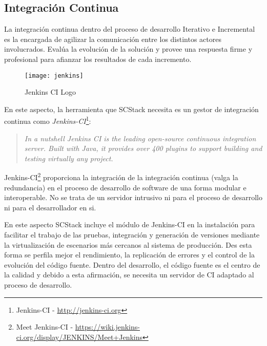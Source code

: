 

\subsection{Integración Continua}
\label{sub:ci-jenkins}

\par  La integración continua dentro del proceso de desarrollo Iterativo e Incremental es la encargada de agilizar la comunicación entre los distintos actores involucrados. Evalúa la evolución de la solución y provee una respuesta firme y profesional para afianzar los resultados de cada incremento.

\begin{figure}[H]
    \centering
    \texttt{[image: jenkins]}
    \caption{Jenkins CI Logo}
    \label{fig:jenkins-logo}
\end{figure}


\par En este aspecto, la herramienta que SCStack necesita es un gestor de integración continua como \emph{Jenkins-CI}\footnote{Jenkins-CI - \url{http://jenkins-ci.org}}:

\begin{quote}
    \emph{In a nutshell Jenkins CI is the leading open-source continuous integration server. Built with Java, it provides over 400 plugins to support building and testing virtually any project.}
\end{quote}

\par Jenkins-CI\footnote{Meet Jenkins-CI - \url{https://wiki.jenkins-ci.org/display/JENKINS/Meet+Jenkins}} proporciona la integración de la integración continua (valga la redundancia) en el proceso de desarrollo de software de una forma modular e interoperable. No se trata de un servidor intrusivo ni para el proceso de desarrollo ni para el desarrollador en si.

\par En este aspecto SCStack incluye el módulo de Jenkins-CI en la instalación para facilitar el trabajo de las pruebas, integración y generación de versiones mediante la virtualización de escenarios más cercanos al sistema de producción. Des esta forma se perfila mejor el rendimiento, la replicación de errores y el control de la evolución del código fuente. Dentro del desarrollo, el código fuente es el centro de la calidad y debido a esta afirmación, se necesita un servidor de CI adaptado al proceso de desarrollo.

